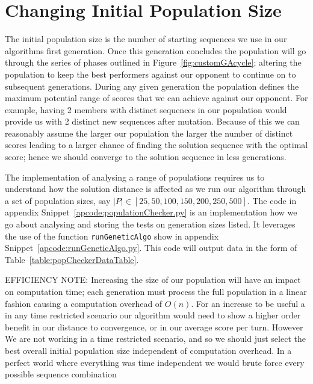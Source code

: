 \section{Changing Initial Population Size}\label{sec:ChangingInitialPopulationSize}
The initial population size is the number of starting sequences we use in our algorithms first generation.
Once this generation concludes the population will go through the series of phases outlined in Figure~\ref{fig:customGAcycle}; altering the population to keep the best performers against our opponent to continue on to subsequent generations.
During any given generation the population defines the maximum potential range of scores that we can achieve against our opponent.
For example, having 2 members with distinct sequences in our population would provide us with 2 distinct new sequences after mutation.
Because of this we can reasonably assume the larger our population the larger the number of distinct scores leading to a larger chance of finding the solution sequence with the optimal score;
hence we should converge to the solution sequence in less generations.

The implementation of analysing a range of populations requires us to understand how the solution distance is affected as we run our algorithm through a set of population sizes, say \(|P| \in [25,50,100,150,200,250,500]\).
The code in appendix Snippet~\ref{apcode:populationChecker.py} is an implementation how we go about analysing and storing the tests on generation sizes listed.
It leverages the use of the function \texttt{runGeneticAlgo} show in appendix Snippet~\ref{apcode:runGeneticAlgo.py}.
This code will output data in the form of Table~\ref{table:popCheckerDataTable}.

EFFICIENCY NOTE\@: Increasing the size of our population will have an impact on computation time;
each generation must process the full population in a linear fashion causing a computation overhead of \(O(n)\).
For an increase to be useful a in any time restricted scenario our algorithm would need to show a higher order benefit in our distance to convergence, or in our average score per turn.
However We are not working in a time restricted scenario, and so we should just select the best overall initial population size independent of computation overhead.
In a perfect world where everything was time independent we would brute force every possible sequence combination

